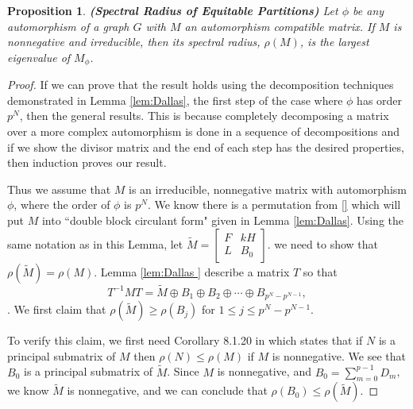 \documentclass[preprint,12pt]{elsarticle}
\newtheorem{prop}[thm]{Proposition}
\theoremstyle{definition}
\theoremstyle{remark}
\begin{document}
\begin{prop}\label{lem:3}\textbf{(Spectral Radius of Equitable Partitions)}
Let $\phi$ be any automorphism of a graph $G$ with $M$ an automorphism compatible matrix. If $M$ is nonnegative and irreducible, then its spectral radius, $\rho(M)$, is the largest eigenvalue of $M_{\phi}$.
\end{prop}

\begin{proof}
  If we can prove that the result holds using the decomposition techniques demonstrated in Lemma \ref{lem:Dallas}, the first step of the case where $\phi$ has order $p^N$, then the general results.  This is because completely decomposing a matrix over a more complex automorphism is done in a sequence of decompositions and if we show the divisor matrix and the end of each step has the desired properties, then induction proves our result.

Thus we assume that $M$ is an irreducible, nonnegative matrix with automorphism $\phi$, where the order of $\phi$ is $p^N$.  We know there is a permutation from \ref{} which will put $M$ into ``double block circulant form" given in Lemma \ref{lem:Dallas}. Using the same notation as in this Lemma, let $\tilde{M}=\left[\begin{array}{rr} F & kH \\ L & B_0 \end{array}\right]$. we need to show that $\rho(\tilde{M})=\rho(M)$.
Lemma \ref{lem:Dallas } describe a matrix $T$ so that \[
T^{-1} M T = \tilde{M}
\oplus B_1 \oplus B_2 \oplus \cdots \oplus B_{p^N-p^{N-1}},
\].
We first claim that $\rho(\tilde{M})\geq\rho(B_j)$ for $1\leq j\leq p^{N}-p^{N-1}.$

To verify this claim, we first need Corollary 8.1.20 in \cite{Horn85} which states that if $N$ is a principal submatrix of $M$ then $\rho(N)\leq\rho(M)$ if $M$ is nonnegative. We see that $B_0$ is a principal submatrix of $\tilde{M}$.  Since $M$ is nonnegative, and $B_0=\sum_{m=0}^{p-1}D_m$, we know $\tilde{M}$ is nonnegative, and  we can conclude that $\rho(B_0)\leq\rho(\tilde{M})$.


\end{proof}
\end{document}
